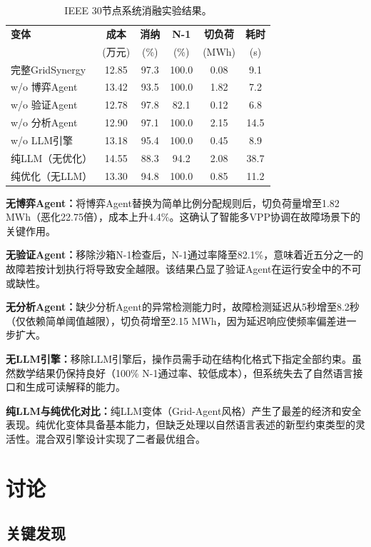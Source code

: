 \documentclass[conference]{IEEEtran}
\begin{document}
\begin{table}[t]
\centering
\caption{IEEE 30节点系统消融实验结果。}
\label{tab:ablation}
\begin{tabular}{lccccc}
\toprule
\textbf{变体} & \textbf{成本} & \textbf{消纳} & \textbf{N-1} & \textbf{切负荷} & \textbf{耗时} \\
 & (万元) & (\%) & (\%) & (MWh) & (s) \\
\midrule
完整GridSynergy    & 12.85 & 97.3 & 100.0 & 0.08  & 9.1  \\
w/o 博弈Agent      & 13.42 & 93.5 & 100.0 & 1.82  & 7.2  \\
w/o 验证Agent      & 12.78 & 97.8 & 82.1  & 0.12  & 6.8  \\
w/o 分析Agent      & 12.90 & 97.1 & 100.0 & 2.15  & 14.5 \\
w/o LLM引擎        & 13.18 & 95.4 & 100.0 & 0.45  & 8.9  \\
纯LLM（无优化）    & 14.55 & 88.3 & 94.2  & 2.08  & 38.7 \\
纯优化（无LLM）    & 13.30 & 94.8 & 100.0 & 0.85  & 11.2 \\
\bottomrule
\end{tabular}
\end{table}

\textbf{无博弈Agent：}将博弈Agent替换为简单比例分配规则后，切负荷量增至1.82 MWh（恶化22.75倍），成本上升4.4\%。这确认了智能多VPP协调在故障场景下的关键作用。

\textbf{无验证Agent：}移除沙箱N-1检查后，N-1通过率降至82.1\%，意味着近五分之一的故障若按计划执行将导致安全越限。该结果凸显了验证Agent在运行安全中的不可或缺性。

\textbf{无分析Agent：}缺少分析Agent的异常检测能力时，故障检测延迟从5秒增至8.2秒（仅依赖简单阈值越限），切负荷增至2.15 MWh，因为延迟响应使频率偏差进一步扩大。

\textbf{无LLM引擎：}移除LLM引擎后，操作员需手动在结构化格式下指定全部约束。虽然数学结果仍保持良好（100\% N-1通过率、较低成本），但系统失去了自然语言接口和生成可读解释的能力。

\textbf{纯LLM与纯优化对比：}纯LLM变体（Grid-Agent风格）产生了最差的经济和安全表现。纯优化变体具备基本能力，但缺乏处理以自然语言表述的新型约束类型的灵活性。混合双引擎设计实现了二者最优组合。

\section{讨论}

\subsection{关键发现}
\end{document}
